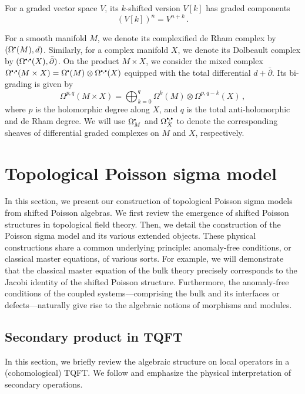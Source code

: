\documentclass[11pt]{article}
\newcommand\sbullet[1][.5]{\mathbin{\vcenter{\hbox{\scalebox{#1}{$\bullet$}}}}}
\numberwithin{equation}{section}
\begin{document}
	For a graded vector space $V$, its $k$-shifted version $V[k]$ has graded components
	\begin{equation}
		(V[k])^{n} = V^{n+k}\,.
	\end{equation}
	
	For a smooth manifold $M$, we denote its complexified de Rham complex by $(\Omega^{\sbullet}(M),d)$. Similarly, for a complex manifold $X$, we denote its Dolbeault complex by $(\Omega^{\sbullet,\sbullet}(X),\bar{\partial})$. On the product $M\times X$, we consider the mixed complex $\Omega^{\sbullet,\sbullet}(M\times X) = \Omega^{\sbullet}(M)\otimes \Omega^{\sbullet,\sbullet}(X)$ equipped with the total differential $d + \bar{\partial}$. Its bi-grading is given by
	\begin{equation}
		\Omega^{p,q}(M\times X) = \bigoplus_{k = 0}^{q}\Omega^{k}(M)\otimes \Omega^{p,q-k}(X)\,,
	\end{equation}
	where $p$ is the holomorphic degree along $X$, and $q$ is the total anti-holomorphic and de Rham degree. 
	We will use $\Omega^{\sbullet}_M$ and $\Omega^{\sbullet,\sbullet}_{X}$ to denote the corresponding sheaves of differential graded complexes on $M$ and $X$, respectively.
	
	\section{Topological Poisson sigma model}
	\label{sec:top_PSM}
	In this section, we present our construction of topological Poisson sigma models from shifted Poisson algebras. We first review the emergence of shifted Poisson structures in topological field theory. Then, we detail the construction of the Poisson sigma model and its various extended objects. These physical constructions share a common underlying principle: anomaly-free conditions, or classical master equations, of various sorts. For example, we will demonstrate that the classical master equation of the bulk theory precisely corresponds to the Jacobi identity of the shifted Poisson structure. Furthermore, the anomaly-free conditions of the coupled systems—comprising the bulk and its interfaces or defects—naturally give rise to the algebraic notions of morphisms and modules.

	\subsection{Secondary product in TQFT}
\label{sec:sec_bulk}
In this section, we briefly review the algebraic structure on local operators in a (cohomological) TQFT. We follow \cite{beem2020secondary} and emphasize the physical interpretation of secondary operations.
\end{document}
